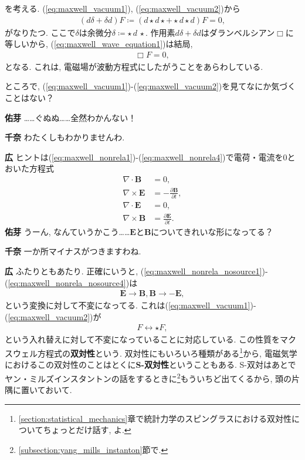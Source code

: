 \documentclass{ltjsarticle}
\theoremstyle{definition}
\newcommand{\parno}{\par\noindent}
\begin{document}
\parno
を考える. (\ref{eq:maxwell_vacuum1}), (\ref{eq:maxwell_vacuum2})から
\begin{gather}
(d\delta+\delta d)F\coloneqq(d\star d\star+\star d\star d)F=0,\label{eq:maxwell_wave_equation1}
\end{gather}
がなりたつ. ここで$\delta$は余微分$\delta\coloneqq \star\,d\,\star$. 作用素$d\delta+\delta d$はダランベルシアン$\Box$に等しいから, (\ref{eq:maxwell_wave_equation1})は結局,
\begin{gather}
  \Box F=0,
\end{gather}
となる. これは, 電磁場が波動方程式にしたがうことをあらわしている.\par
ところで, (\ref{eq:maxwell_vacuum1})-(\ref{eq:maxwell_vacuum2})を見てなにか気づくことはない？\parno
\textbf{佑芽} ……ぐぬぬ……全然わかんない！\parno
\textbf{千奈} わたくしもわかりませんわ.\parno
\textbf{広} ヒントは(\ref{eq:maxwell_nonrela1})-(\ref{eq:maxwell_nonrela4})で電荷・電流を0とおいた方程式
\begin{align}
  \nabla\cdot\boldsymbol B&=0,\label{eq:maxwell_nonrela_nosource1}\\
  \nabla\times\boldsymbol E&=-\frac{\partial\boldsymbol B}{\partial t},\\
  \nabla\cdot\boldsymbol E&=0,\\
  \nabla\times\boldsymbol B&=\frac{\partial\boldsymbol E}{\partial t}.\label{eq:maxwell_nonrela_nosource4}
\end{align}
\textbf{佑芽} うーん, なんていうかこう……$\boldsymbol E$と$\boldsymbol B$についてきれいな形になってる？\parno
\textbf{千奈} 一か所マイナスがつきますわね.\parno
\textbf{広} ふたりともあたり. 正確にいうと, (\ref{eq:maxwell_nonrela_nosource1})-(\ref{eq:maxwell_nonrela_nosource4})は
\begin{gather}
  \boldsymbol E\rightarrow\boldsymbol B, \boldsymbol B\rightarrow-\boldsymbol E,
\end{gather}
という変換に対して不変になってる. これは(\ref{eq:maxwell_vacuum1})-(\ref{eq:maxwell_vacuum2})が
\begin{gather}
  F\leftrightarrow \star F,
\end{gather}
という入れ替えに対して不変になっていることに対応している. この性質をマクスウェル方程式の\textbf{双対性}という. 双対性にもいろいろ種類がある\footnote{\ref{section:statistical_mechanics}章で統計力学のスピングラスにおける双対性についてちょっとだけ話す, よ.}から, 電磁気学におけるこの双対性のことはとくに\textbf{S-双対性}ということもある. S-双対はあとでヤン・ミルズインスタントンの話をするときに\footnote{\ref{subsection:yang_mills_instanton}節で.}もういちど出てくるから, 頭の片隅に置いておいて.
\end{document}
